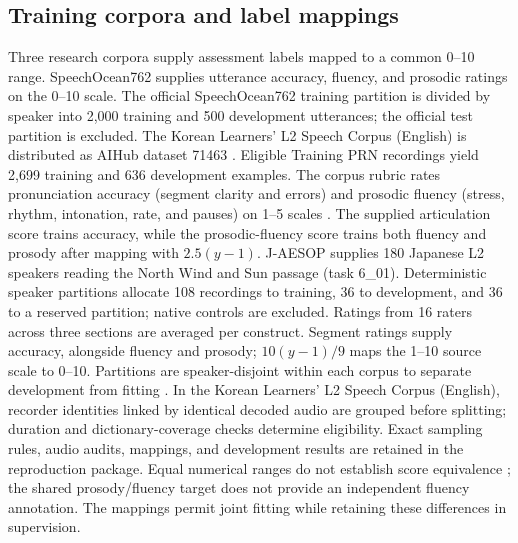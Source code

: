 \documentclass[cameraready]{Interspeech}
\begin{document}
\subsection{Training corpora and label mappings}
Three research corpora supply assessment labels mapped to a common 0--10 range. SpeechOcean762 supplies utterance accuracy, fluency, and prosodic ratings on the 0--10 scale. The official SpeechOcean762 training partition is divided by speaker into 2,000 training and 500 development utterances; the official test partition is excluded. The Korean Learners' L2 Speech Corpus (English) \cite{han} is distributed as AIHub dataset 71463 \cite{aihub}. Eligible Training PRN recordings yield 2,699 training and 636 development examples. The corpus rubric rates pronunciation accuracy (segment clarity and errors) and prosodic fluency (stress, rhythm, intonation, rate, and pauses) on 1--5 scales \cite{han}. The supplied articulation score trains accuracy, while the prosodic-fluency score trains both fluency and prosody after mapping with $2.5(y-1)$. J-AESOP \cite{aesop} supplies 180 Japanese L2 speakers reading the North Wind and Sun passage (task 6\_01). Deterministic speaker partitions allocate 108 recordings to training, 36 to development, and 36 to a reserved partition; native controls are excluded. Ratings from 16 raters across three sections are averaged per construct. Segment ratings supply accuracy, alongside fluency and prosody; $10(y-1)/9$ maps the 1--10 source scale to 0--10. Partitions are speaker-disjoint within each corpus to separate development from fitting \cite{cawley}. In the Korean Learners' L2 Speech Corpus (English), recorder identities linked by identical decoded audio are grouped before splitting; duration and dictionary-coverage checks determine eligibility. Exact sampling rules, audio audits, mappings, and development results are retained in the reproduction package. Equal numerical ranges do not establish score equivalence \cite{dorans}; the shared prosody/fluency target does not provide an independent fluency annotation. The mappings permit joint fitting while retaining these differences in supervision.
\end{document}
